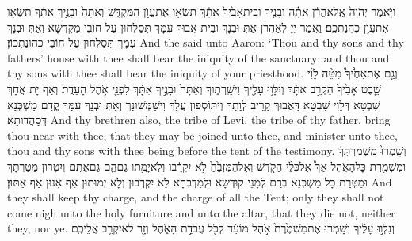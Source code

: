 \newperek
{}%
{וַיֹּ֤אמֶר יְהֹוָה֙ אֶֽל\maqqaf אַהֲרֹ֔ן אַתָּ֗ה וּבָנֶ֤יךָ וּבֵית\maqqaf אָבִ֙יךָ֙ אִתָּ֔ךְ תִּשְׂא֖וּ אֶת\maqqaf עֲוֺ֣ן הַמִּקְדָּ֑שׁ וְאַתָּה֙ וּבָנֶ֣יךָ אִתָּ֔ךְ תִּשְׂא֖וּ אֶת\maqqaf עֲוֺ֥ן כְּהֻנַּתְכֶֽם׃}
{וַאֲמַר יְיָ לְאַהֲרֹן אַתְּ וּבְנָךְ וּבֵית אֲבוּךְ עִמָּךְ תְּסַלְּחוּן עַל חוֹבֵי מַקְדְּשָׁא וְאַתְּ וּבְנָךְ עִמָּךְ תְּסַלְּחוּן עַל חוֹבֵי כְּהוּנַּתְכוֹן׃}
{And the \lord\space said unto Aaron: ‘Thou and thy sons and thy fathers’ house with thee shall bear the iniquity of the sanctuary; and thou and thy sons with thee shall bear the iniquity of your priesthood.}{}
{וְגַ֣ם אֶת\maqqaf אַחֶ֩יךָ֩ מַטֵּ֨ה לֵוִ֜י שֵׁ֤בֶט אָבִ֙יךָ֙ הַקְרֵ֣ב אִתָּ֔ךְ וְיִלָּו֥וּ עָלֶ֖יךָ וִישָֽׁרְת֑וּךָ וְאַתָּה֙ וּבָנֶ֣יךָ אִתָּ֔ךְ לִפְנֵ֖י אֹ֥הֶל הָעֵדֻֽת׃}
{וְאַף יָת אֲחָךְ שִׁבְטָא דְּלֵוִי שִׁבְטָא דַּאֲבוּךְ קָרֵיב לְוָתָךְ וְיִתּוֹסְפוּן עֲלָךְ וִישַׁמְּשׁוּנָּךְ וְאַתְּ וּבְנָךְ עִמָּךְ קֳדָם מַשְׁכְּנָא דְּסָהֲדוּתָא׃}
{And thy brethren also, the tribe of Levi, the tribe of thy father, bring thou near with thee, that they may be joined unto thee, and minister unto thee, thou and thy sons with thee being before the tent of the testimony.}{}
{וְשָֽׁמְרוּ֙ מִֽשְׁמַרְתְּךָ֔ וּמִשְׁמֶ֖רֶת כׇּל\maqqaf הָאֹ֑הֶל אַךְ֩ אֶל\maqqaf כְּלֵ֨י הַקֹּ֤דֶשׁ וְאֶל\maqqaf הַמִּזְבֵּ֙חַ֙ לֹ֣א יִקְרָ֔בוּ וְלֹֽא\maqqaf יָמֻ֥תוּ גַם\maqqaf הֵ֖ם גַּם\maqqaf אַתֶּֽם׃}
{וְיִטְּרוּן מַטַּרְתָּךְ וּמַטְּרַת כָּל מַשְׁכְּנָא בְּרַם לְמָנֵי קוּדְשָׁא וּלְמַדְבְּחָא לָא יִקְרְבוּן וְלָא יְמוּתוּן אַף אִנּוּן אַף אַתּוּן׃}
{And they shall keep thy charge, and the charge of all the Tent; only they shall not come nigh unto the holy furniture and unto the altar, that they die not, neither they, nor ye.}{}
{וְנִלְו֣וּ עָלֶ֔יךָ וְשָֽׁמְר֗וּ אֶת\maqqaf מִשְׁמֶ֙רֶת֙ אֹ֣הֶל מוֹעֵ֔ד לְכֹ֖ל עֲבֹדַ֣ת הָאֹ֑הֶל וְזָ֖ר לֹא\maqqaf יִקְרַ֥ב אֲלֵיכֶֽם׃}
